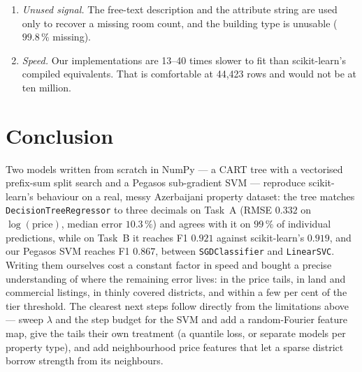 \documentclass[10pt,twocolumn,a4paper]{article}
\begin{document}
\begin{enumerate}
    Section~\ref{sec:data} are fixed domain thresholds, not learned ones, but
    they are still our choices, and they remove $0.13\,\%$ of rows; the re-post key is deliberately strict, so some
    duplicate properties certainly survive it.
  \item \emph{Unused signal.} The free-text description and the attribute
    string are used only to recover a missing room count, and the building
    type is unusable ($99.8\,\%$ missing).
  \item \emph{Speed.} Our implementations are 13--40 times slower to fit than
    scikit-learn's compiled equivalents. That is comfortable at 44{,}423 rows
    and would not be at ten million.
\end{enumerate}

\section{Conclusion}
Two models written from scratch in NumPy --- a CART tree with a vectorised
prefix-sum split search and a Pegasos sub-gradient SVM --- reproduce
scikit-learn's behaviour on a real, messy Azerbaijani property dataset: the
tree matches \texttt{DecisionTreeRegressor} to three decimals on Task~A
(RMSE $0.332$ on $\log(\text{price})$, median error $10.3\,\%$) and agrees
with it on $99\,\%$ of individual predictions, while on Task~B it reaches F1
$0.921$ against scikit-learn's $0.919$, and our Pegasos SVM reaches F1
$0.867$, between \texttt{SGDClassifier} and \texttt{LinearSVC}. Writing them
ourselves cost a constant factor in speed and bought a precise understanding
of where the remaining error lives: in the price tails, in land and commercial
listings, in thinly covered districts, and within a few per cent of the tier
threshold. The clearest next steps follow directly from the limitations above
--- sweep $\lambda$ and the step budget for the SVM and add a random-Fourier
feature map, give the tails their own treatment (a quantile loss, or separate
models per property type), and add neighbourhood price features that let a
sparse district borrow strength from its neighbours.
\end{document}
